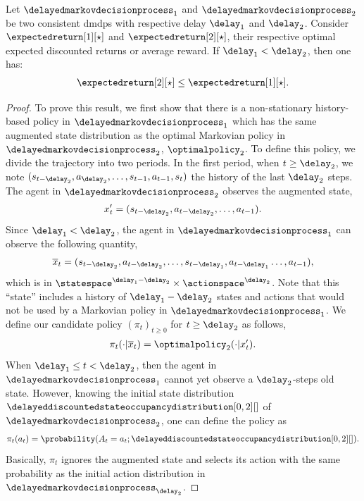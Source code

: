 \begin{thm}
\label{th:perf_delay_vector_all_weight}
    Let $\delayedmarkovdecisionprocess_{1}$ and $\delayedmarkovdecisionprocess_{2}$ be two consistent \glspl{dmdp} with respective delay $\delay_1$ and $\delay_2$.
    Consider $\expectedreturn[1][\star]$ and $\expectedreturn[2][\star]$, their respective optimal expected discounted returns or average reward.
    If $\delay_1<\delay_2$, then one has:
    \begin{align*}
        \expectedreturn[2][\star] \le \expectedreturn[1][\star].
    \end{align*}
\end{thm}
\begin{proof}
    To prove this result, we first show that there is a non-stationary history-based policy in $\delayedmarkovdecisionprocess_{1}$ which has the same augmented state distribution as the optimal Markovian policy in $\delayedmarkovdecisionprocess_{2}$, $\optimalpolicy_2$.
    To define this policy, we divide the trajectory into two periods.
    In the first period, when $t\ge\delay_2$, we note $(s_{t-{\delay_2}},a_{\delay_2},\dots,s_{t-1},a_{t-1},s_t)$ the history of the last $\delay_2$ steps. 
    The agent in $\delayedmarkovdecisionprocess_{2}$ observes the augmented state,
    \begin{align*}
        x_t'=(s_{t-{\delay_2}},a_{t-{\delay_2}},\dots,a_{t-1}).
    \end{align*}
    Since $\delay_1<\delay_2$, the agent in $\delayedmarkovdecisionprocess_{1}$ can observe the following quantity,
    \begin{align*}
        \overline x_t=(s_{t-{\delay_2}},a_{t-{\delay_2}},\dots,s_{t-{\delay_1}},a_{t-{\delay_1}}\dots,a_{t-1}),
    \end{align*}
    which is in $\statespace^{\delay_1-\delay_2}\times\actionspace^{\delay_2}$. 
    Note that this ``state'' includes a history of $\delay_1-\delay_2$ states and actions that would not be used by a Markovian policy in $\delayedmarkovdecisionprocess_{1}$.
    We define our candidate policy $(\pi_t)_{t\ge0}$ for  $t\ge\delay_2$ as follows,
    \begin{align*}
        \pi_t(\cdot\vert\overline x_t) = \optimalpolicy_2(\cdot\vert x_t').
    \end{align*}
    When $\delay_1\le t<\delay_2$, then the agent in $\delayedmarkovdecisionprocess_{1}$ cannot yet observe a $\delay_2$-steps old state.
    However, knowing the initial state distribution $\delayeddiscountedstateoccupancydistribution[0,2][]$ of $\delayedmarkovdecisionprocess_{2}$, one can define the policy as 
    \begin{align*}
        \pi_t(a_t) = \probability(A_t=a_t;\delayeddiscountedstateoccupancydistribution[0,2][]).
    \end{align*}
    Basically, $\pi_t$ ignores the augmented state and selects its action with the same probability as the initial action distribution in $\delayedmarkovdecisionprocess_{\delay_2}$.
    

\end{proof}
